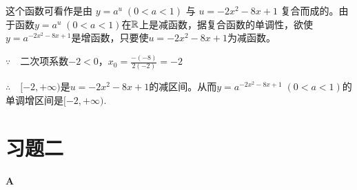  \begin{solution}
     这个函数可看作是由
 $y=a^u\; (0<a<1)$ 与
 $u=-2x^2-8x+1$
 复合而成的。由于函数$y=a^u\; (0<a<1)$在$\mathbb{R}$上是减函数，据复合函数的单调性，欲使$y=a^{-2x^2-8x+1}$是增函数，只要使$u=-2x^2-8x+1$为减函数。
 
 $\because\quad $二次项系数$-2<0$，$x_0=\frac{-(-8)}{2(-2)}=-2$
 
 $\therefore\quad [-2,+\infty)$是$u=-2x^2-8x+1$的减区间。从而$y=a^{-2x^2-8x+1}\; (0<a<1)$的单调增区间是$[-2,+\infty)$.
 \end{solution}
 
 \section*{习题二}
 \begin{center}
     \bfseries A
 \end{center}
 
